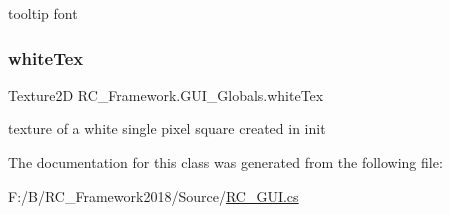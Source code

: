 tooltip font 

\mbox{\label{class_r_c___framework_1_1_g_u_i___globals_a15d0dc59ca1781f17cc4f9feff08a69d}} 
\subsubsection{\texorpdfstring{white\+Tex}{whiteTex}}
{\footnotesize\ttfamily Texture2D R\+C\+\_\+\+Framework.\+G\+U\+I\+\_\+\+Globals.\+white\+Tex\hspace{0.3cm}{\ttfamily [static]}}



texture of a white single pixel square created in init 



The documentation for this class was generated from the following file\+:\begin{DoxyCompactItemize}
\item 
F\+:/\+B/\+R\+C\+\_\+\+Framework2018/\+Source/\mbox{\hyperlink{_r_c___g_u_i_8cs}{R\+C\+\_\+\+G\+U\+I.\+cs}}\end{DoxyCompactItemize}

